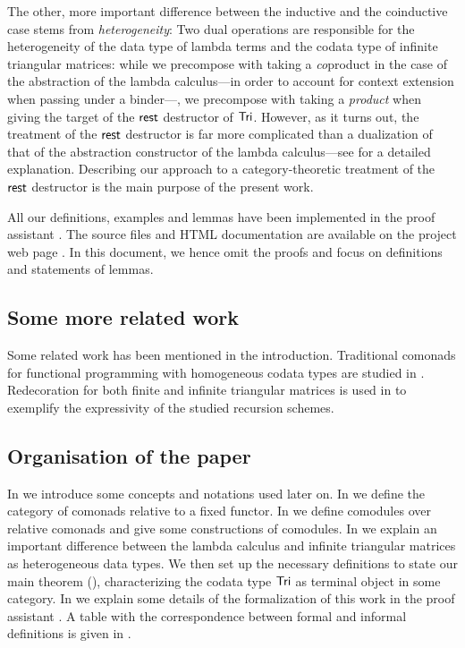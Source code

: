 \documentclass[conference,10pt]{IEEEtran}
\begin{document}
 The other, more important difference between the inductive and the coinductive case stems from \emph{heterogeneity}:
 Two dual operations are responsible for the heterogeneity of the data type of lambda terms and the codata type of infinite triangular
 matrices: while we precompose with taking a \emph{co}product in the case of the abstraction of the lambda calculus---in order to account
 for context extension when passing under a binder---,
 we precompose with taking a \emph{product} when giving the target of the $\mathsf{rest}$ destructor of $\mathsf{Tri}$.
 However, as it turns out, the treatment of the $\mathsf{rest}$ destructor is far more complicated than a dualization of that of the abstraction 
 constructor of the lambda calculus---see  for a detailed explanation. 
 Describing our approach to a category-theoretic treatment of the $\mathsf{rest}$ destructor is the main purpose of the present work.
 
 All our definitions, examples and lemmas have been implemented in the proof assistant \coq \parencite{coq84pl3}.
 The \coq source files and HTML documentation are available on the project web page \parencite{trimat_coq}.
 In this document, we hence omit the proofs and focus on definitions and statements of lemmas.
 
 
 \subsection*{Some more related work}
 Some related work has been mentioned in the introduction.
 Traditional comonads for functional programming with homogeneous codata types are studied in \parencite{DBLP:conf/sfp/UustaluV01}.
 Redecoration for both finite and infinite triangular matrices is used in \parencite{DBLP:journals/tcs/AbelMU05} to exemplify 
 the expressivity of the studied recursion schemes.
 
 
 
\subsection*{Organisation of the paper}
  In  we introduce some concepts and notations used later on.
  In  we define the category of comonads relative to a fixed functor.
  In  we define comodules over relative comonads and give some constructions of comodules.
  In  we explain an important difference between the lambda calculus and infinite triangular matrices
    as heterogeneous data types. We then set up the necessary definitions to state our main theorem (), 
    characterizing the codata type $\mathsf{Tri}$ as terminal object in some category.
  In  we explain some details of the formalization of this work in the proof assistant \coq.
  A table with the correspondence between formal and informal definitions is given in .
\end{document}
